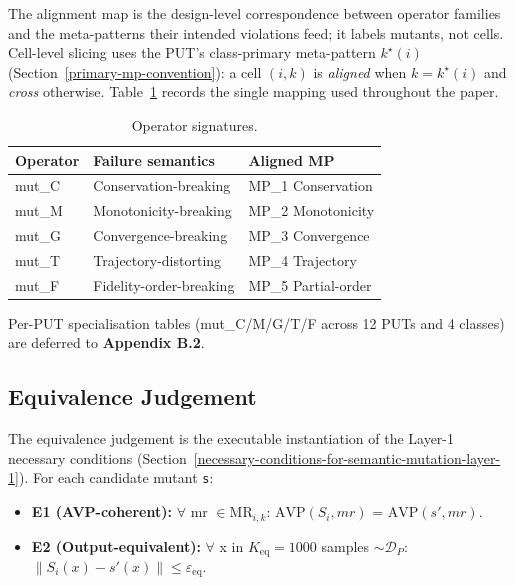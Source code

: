 \documentclass[review,12pt,authoryear]{elsarticle}
\providecommand{\tightlist}{\setlength{\itemsep}{0pt}\setlength{\parskip}{0pt}}
\begin{document}
The alignment map is the design-level correspondence between operator
families and the meta-patterns their intended violations feed; it labels
mutants, not cells. Cell-level slicing uses the PUT's class-primary
meta-pattern $k^\star(i)$ (Section~\ref{primary-mp-convention}): a cell
$(i,k)$ is \emph{aligned} when $k = k^\star(i)$ and \emph{cross}
otherwise.
Table~\ref{tab:p2-01} records the single mapping used throughout the
paper.

\begin{table}[t]
\caption{Operator signatures.}\label{tab:p2-01}
\centering
\begin{tabular}{@{}lll@{}}
\toprule
Operator & Failure semantics & Aligned MP \\
\midrule
mut\_C & Conservation-breaking & MP\_1 Conservation \\
mut\_M & Monotonicity-breaking & MP\_2 Monotonicity \\
mut\_G & Convergence-breaking & MP\_3 Convergence \\
mut\_T & Trajectory-distorting & MP\_4 Trajectory \\
mut\_F & Fidelity-order-breaking & MP\_5 Partial-order \\
\bottomrule
\end{tabular}
\end{table}

Per-PUT specialisation tables (mut\_C/M/G/T/F across 12 PUTs and 4
classes) are deferred to \textbf{Appendix B.2}.

\subsection{Equivalence Judgement}\label{equivalence-judgement-e1-e2-layer-2}

The equivalence judgement is the executable instantiation of the Layer-1
necessary conditions (Section~\ref{necessary-conditions-for-semantic-mutation-layer-1}). For each candidate mutant
\texttt{s\textquotesingle{}}:

\begin{itemize}
\tightlist
\item
  \textbf{E1 (AVP-coherent):} $\forall$ mr $\in \mathrm{MR}_{i,k}$: $\mathrm{AVP}(S_i, mr)$ =
  $\mathrm{AVP}(s', mr)$.
\item
  \textbf{E2 (Output-equivalent):} $\forall$ x in $K_{\mathrm{eq}}=1000$ samples
  $\sim \mathcal{D}_P$: $\|S_i(x) - s'(x)\| \leq \varepsilon_{\mathrm{eq}}$.
\end{itemize}
\end{document}
